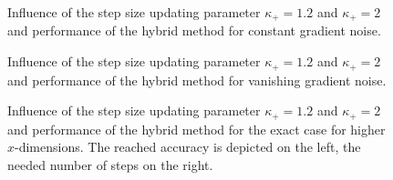\vspace{-1.5em}

\begin{figure}[H]
	\begin{subfigure}{0.49\textwidth}
	\end{subfigure}
	\begin{subfigure}{0.49\textwidth}
	\end{subfigure}
	\caption[Influence of the step size updating parameter and hybrid method: constant gradient noise]{Influence of the step size updating parameter \(\kappa_+ = 1.2\) and \(\kappa_+ =2 \) and performance of the hybrid method for constant gradient noise.}%
	\label{fig_const_grad_noise_comp}%
\end{figure}

\vspace{-1.5em}

\begin{figure}[H]
	\begin{subfigure}{0.49\textwidth}
	\end{subfigure}
	\begin{subfigure}{0.49\textwidth}
	\end{subfigure}
	\caption[Influence of the step size updating parameter and hybrid method: vanishing gradient noise]{Influence of the step size updating parameter \(\kappa_+ = 1.2\) and \(\kappa_+ =2 \) and performance of the hybrid method for vanishing gradient noise.}%
	\label{fig_van_grad_noise_comp}%
\end{figure}

\vspace{-1.5em}


\begin{figure}[H]%
	\begin{subfigure}{0.49\textwidth}
	\end{subfigure}
	\begin{subfigure}{0.49\textwidth}
	\end{subfigure}
	\label{fig_no_noise_comp_large}
	\caption[Influence of the step size updating parameter and hybrid method: vanishing noise, higher dimensions]{Influence of the step size updating parameter \(\kappa_+ = 1.2\) and \(\kappa_+ =2 \) and performance of the hybrid method for the exact case for higher \(x\)-dimensions. The reached accuracy is depicted on the left, the needed number of steps on the right.}
\end{figure}

